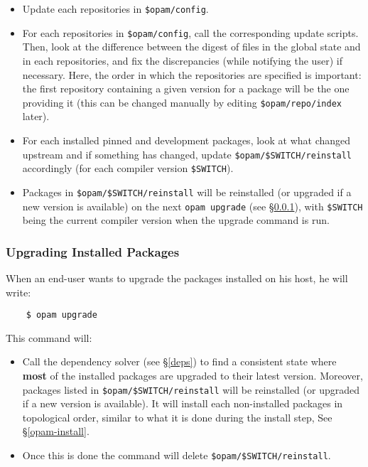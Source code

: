 \documentclass[a4paper,10pt]{article}
\begin{document}
\begin{itemize}

\item Update each repositories in \verb+$opam/config+.

\item For each repositories in \verb+$opam/config+, call the
  corresponding update scripts. Then, look at the difference between
  the digest of files in the global state and in each repositories,
  and fix the discrepancies (while notifying the user) if necessary.
  Here, the order in which the repositories are specified
  is important: the first repository containing a given version for a
  package will be the one providing it (this can be changed manually
  by editing \verb+$opam/repo/index+ later).

\item For each installed pinned and development packages, look at what
  changed upstream and if something has changed, update
  \verb+$opam/$SWITCH/reinstall+ accordingly (for each compiler
  version \verb+$SWITCH+).

\item Packages in \verb+$opam/$SWITCH/reinstall+ will be reinstalled (or
  upgraded if a new version is available) on the next {\tt opam
    upgrade} (see \S\ref{opam-upgrade}), with \verb+$SWITCH+ being
  the current compiler version when the upgrade command is run.

\end{itemize}

\subsubsection{Upgrading Installed Packages}
\label{opam-upgrade}

When an end-user wants to upgrade the packages installed on his host,
he will write:

\begin{verbatim}
    $ opam upgrade
\end{verbatim}

This command will:

\begin{itemize}

\item Call the dependency solver (see \S\ref{deps}) to
find a consistent state where {\bf most} of the installed packages are
upgraded to their latest version. Moreover, packages listed in
\verb+$opam/$SWITCH/reinstall+ will be reinstalled (or upgraded if a new
version is available). It will install each non-installed packages in
topological order, similar to what it is done during the install step,
See \S\ref{opam-install}.

\item Once this is done the command will delete
  \verb+$opam/$SWITCH/reinstall+.

\end{itemize}
\end{document}
